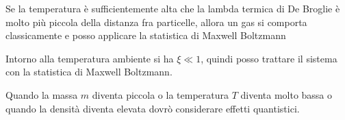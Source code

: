 Se la temperatura è sufficientemente alta che la lambda termica di De Broglie è molto più piccola della distanza fra particelle, allora un gas si comporta classicamente e posso applicare la statistica di Maxwell Boltzmann

Intorno alla temperatura ambiente si ha $\xi \ll 1$, quindi posso trattare il sistema con la statistica di Maxwell Boltzmann.

Quando la massa $m$ diventa piccola o la temperatura $T$ diventa molto bassa o quando la densità diventa elevata dovrò considerare effetti quantistici.











